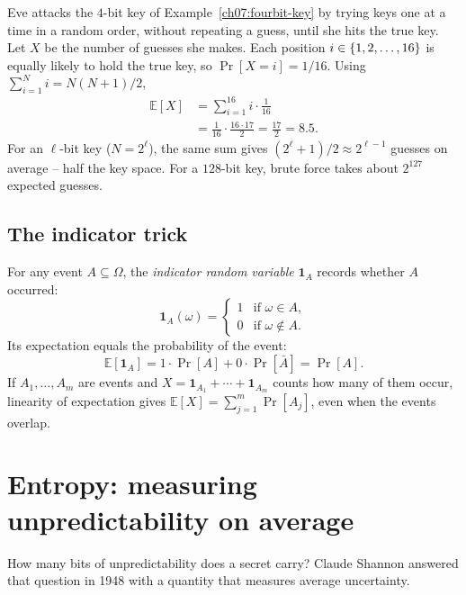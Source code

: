 \begin{example}
\label{ch07:expected-guesses}
Eve attacks the $4$-bit key of Example~\ref{ch07:fourbit-key} by trying keys one at a time in a random order, without repeating a guess, until she hits the true key. Let $X$ be the number of guesses she makes. Each position $i \in \{1,2,\dots,16\}$ is equally likely to hold the true key, so $\Pr[X = i] = 1/16$. Using $\sum_{i=1}^{N} i = N(N+1)/2$,
\begin{align*}
  \mathbb{E}[X] &= \sum_{i=1}^{16} i \cdot \frac{1}{16} \\
                &= \frac{1}{16} \cdot \frac{16 \cdot 17}{2} = \frac{17}{2} = 8.5.
\end{align*}
For an $\ell$-bit key ($N = 2^\ell$), the same sum gives $(2^\ell + 1)/2 \approx 2^{\ell-1}$ guesses on average -- half the key space. For a $128$-bit key, brute force takes about $2^{127}$ expected guesses.
\end{example}

\subsection{The indicator trick}

For any event $A \subseteq \Omega$, the \emph{indicator random variable} $\mathbf{1}_A$ records whether $A$ occurred:
\[
  \mathbf{1}_A(\omega) =
  \begin{cases}
    1 & \text{if } \omega \in A, \\
    0 & \text{if } \omega \notin A.
  \end{cases}
\]
Its expectation equals the probability of the event:
\[
  \mathbb{E}[\mathbf{1}_A] = 1 \cdot \Pr[A] + 0 \cdot \Pr[\bar A] = \Pr[A].
\]
If $A_1, \dots, A_m$ are events and $X = \mathbf{1}_{A_1} + \cdots + \mathbf{1}_{A_m}$ counts how many of them occur, linearity of expectation gives $\mathbb{E}[X] = \sum_{j=1}^{m} \Pr[A_j]$, even when the events overlap.

\section{Entropy: measuring unpredictability on average}

How many bits of unpredictability does a secret carry? Claude Shannon answered that question in 1948 with a quantity that measures average uncertainty.

